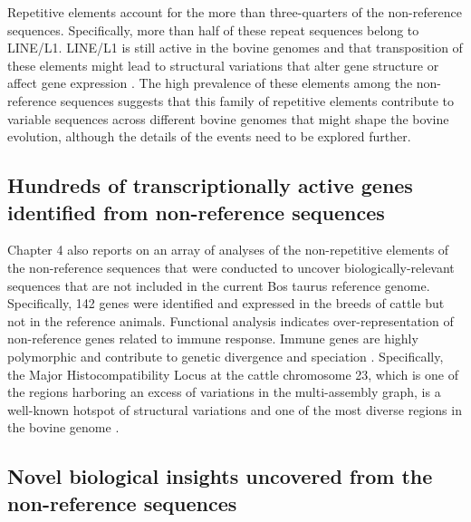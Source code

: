 \documentclass[../main.tex]{subfiles}
\begin{document}
Repetitive elements account for the more than three-quarters of the non-reference sequences. Specifically, more than half of these repeat sequences belong to LINE/L1. LINE/L1 is still active in the bovine genomes and that transposition of these elements might lead to structural variations that alter gene structure or affect gene expression \citep{adelson2009characterization,beck2011line,chen2017detection}. The high prevalence of these elements among the non-reference sequences suggests that this family of repetitive elements contribute to variable sequences across different bovine genomes that might shape the bovine evolution, although the details of the events need to be explored further.

\subsection*{Hundreds of transcriptionally active genes identified from non-reference sequences}

Chapter 4 also reports on an array of analyses of the non-repetitive elements of the non-reference sequences that were conducted to uncover biologically-relevant sequences that are not included in the current Bos taurus reference genome. Specifically, 142 genes were identified and expressed in the breeds of cattle but not in the reference animals. Functional analysis indicates over-representation of non-reference genes related to immune response. Immune genes are highly polymorphic and contribute to genetic divergence and speciation \citep{chen2019large}. Specifically, the Major Histocompatibility Locus at the cattle chromosome 23, which is one of the regions harboring an excess of variations in the multi-assembly graph, is a well-known hotspot of structural variations and one of the most diverse regions in the bovine genome \citep{Hu2020}. 

\subsection*{Novel biological insights uncovered from the non-reference sequences}
\end{document}
